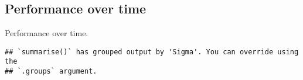 \documentclass[]{book}
\newenvironment{Shaded}{\begin{snugshade}}{\end{snugshade}}
\newcommand{\DataTypeTok}[1]{\textcolor[rgb]{0.13,0.29,0.53}{#1}}
\newcommand{\KeywordTok}[1]{\textcolor[rgb]{0.13,0.29,0.53}{\textbf{#1}}}
\newcommand{\NormalTok}[1]{#1}
\newcommand{\OperatorTok}[1]{\textcolor[rgb]{0.81,0.36,0.00}{\textbf{#1}}}
\newcommand{\StringTok}[1]{\textcolor[rgb]{0.31,0.60,0.02}{#1}}
\begin{document}
\hypertarget{performance-over-time-8}{%
\subsection{Performance over time}\label{performance-over-time-8}}

Performance over time.

\begin{Shaded}
\end{Shaded}

\begin{verbatim}
## `summarise()` has grouped output by 'Sigma'. You can override using the
## `.groups` argument.
\end{verbatim}
\end{document}
